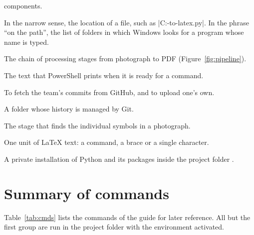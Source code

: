 \begin{description}[style=nextline,leftmargin=1.6em,itemsep=3pt]
  components.
\item[Path] In the narrow sense, the location of a file, such as
  \code|C:\camera-to-latex\config.py|. In the phrase ``on the path'', the list of folders
  in which Windows looks for a program whose name is typed.
\item[Pipeline] The chain of processing stages from photograph to PDF
  (Figure~\ref{fig:pipeline}).
\item[Prompt] The text that PowerShell prints when it is ready for a command.
\item[Pull, push] To fetch the team's commits from GitHub, and to upload one's own.
\item[Repository] A folder whose history is managed by Git.
\item[Segmentation] The stage that finds the individual symbols in a photograph.
\item[Token] One unit of \LaTeX{} text: a command, a brace or a single character.
\item[Virtual environment] A private installation of Python and its packages inside the
  project folder .
\end{description}

\section{Summary of commands}
\label{sec:summary}

Table~\ref{tab:cmds} lists the commands of the guide for later reference. All but the first
group are run in the project folder with the environment activated.

